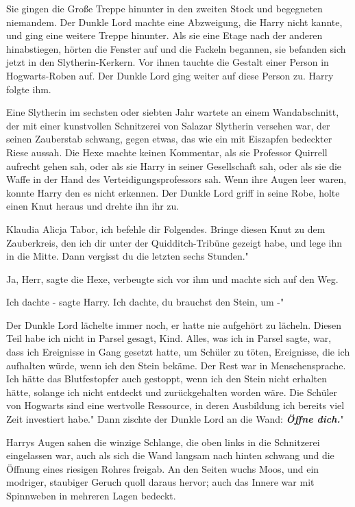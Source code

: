 Sie gingen die Große Treppe hinunter in den zweiten Stock und begegneten
niemandem. Der Dunkle Lord machte eine Abzweigung, die Harry nicht kannte, und
ging eine weitere Treppe hinunter. Als sie eine Etage nach der anderen
hinabstiegen, hörten die Fenster auf und die Fackeln begannen, sie befanden sich
jetzt in den Slytherin-Kerkern. Vor ihnen tauchte die Gestalt einer Person in
Hogwarts-Roben auf. Der Dunkle Lord ging weiter auf diese Person zu. Harry
folgte ihm.

Eine Slytherin im sechsten oder siebten Jahr wartete an einem Wandabschnitt, der
mit einer kunstvollen Schnitzerei von Salazar Slytherin versehen war, der seinen
Zauberstab schwang, gegen etwas, das wie ein mit Eiszapfen bedeckter Riese
aussah. Die Hexe machte keinen Kommentar, als sie Professor Quirrell aufrecht
gehen sah, oder als sie Harry in seiner Gesellschaft sah, oder als sie die Waffe
in der Hand des Verteidigungsprofessors sah. Wenn ihre Augen leer waren, konnte
Harry den es nicht erkennen. Der Dunkle Lord griff in seine Robe, holte einen
Knut heraus und drehte ihn ihr zu.

\glqq{}Klaudia Alicja Tabor, ich befehle dir Folgendes. Bringe diesen Knut zu dem
Zauberkreis, den ich dir unter der Quidditch-Tribüne gezeigt habe, und lege ihn
in die Mitte. Dann vergisst du die letzten sechs Stunden."

\glqq{}Ja, Herr\grqq{}, sagte die Hexe, verbeugte sich vor ihm und machte sich
auf den Weg.

\glqq{}Ich dachte -\grqq{} sagte Harry. \glqq{}Ich dachte, du brauchst den Stein,
um -"

Der Dunkle Lord lächelte immer noch, er hatte nie aufgehört zu lächeln. \glqq
Diesen Teil habe ich nicht in Parsel gesagt, Kind. Alles, was ich in Parsel
sagte, war, dass ich Ereignisse in Gang gesetzt hatte, um Schüler zu töten,
Ereignisse, die ich aufhalten würde, wenn ich den Stein bekäme. Der Rest war in
Menschensprache. Ich hätte das Blutfestopfer auch gestoppt, wenn ich den Stein
nicht erhalten hätte, solange ich nicht entdeckt und zurückgehalten worden wäre.
Die Schüler von Hogwarts sind eine wertvolle Ressource, in deren Ausbildung ich
bereits viel Zeit investiert habe." Dann zischte der Dunkle Lord an die Wand:
\glqq{}\textbf{\emph{Öffne dich.}}"

Harrys Augen sahen die winzige Schlange, die oben links in die Schnitzerei
eingelassen war, auch als sich die Wand langsam nach hinten schwang und die
Öffnung eines riesigen Rohres freigab. An den Seiten wuchs Moos, und ein
modriger, staubiger Geruch quoll daraus hervor; auch das Innere war mit
Spinnweben in mehreren Lagen bedeckt.


